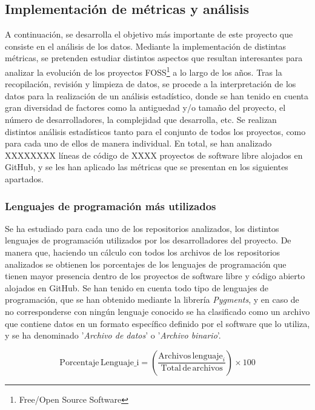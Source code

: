 \documentclass[a4paper, 12pt]{book}
\begin{document}
\subsection{Implementación de métricas y análisis}
\label{subsec:metricas}

A continuación, se desarrolla el objetivo más importante de este proyecto que consiste en el análisis de los datos. Mediante la implementación de distintas métricas, se pretenden estudiar distintos aspectos que resultan interesantes para analizar la evolución de los proyectos
FOSS\footnote{Free/Open Source Software} a lo largo de los años.
Tras la recopilación, revisión y limpieza de datos, se procede a la interpretación de los datos para la realización de un análisis estadístico, donde se han tenido en cuenta gran diversidad de factores como la antiguedad y/o tamaño del proyecto, el número de desarrolladores, la
complejidad que desarrolla, etc. Se realizan distintos análisis estadísticos tanto para el conjunto de todos los proyectos, como para cada uno de ellos de manera individual.
En total, se han analizado XXXXXXXX líneas de código de XXXX proyectos de software libre alojados en GitHub, y se les han aplicado las métricas que se presentan en los siguientes apartados.

\subsubsection{Lenguajes de programación más utilizados}
\label{subsubsec:lenguajes}

Se ha estudiado para cada uno de los repositorios analizados, los distintos lenguajes de programación utilizados por los desarrolladores del proyecto. De manera que, haciendo un cálculo con todos los archivos de los repositorios analizados se obtienen los porcentajes de los lenguajes
de programación que tienen mayor presencia dentro de los proyectos de software libre y código abierto alojados en GitHub. Se han tenido en cuenta todo tipo de lenguajes de programación, que se han obtenido mediante la librería \textit{Pygments},  y en caso de no corresponderse
con ningún lenguaje conocido se ha clasificado como un archivo que contiene datos en un formato específico definido por el software que lo utiliza, y se ha denominado '\textit{Archivo de datos}' o '\textit{Archivo binario}'.

\[\text{Porcentaje} \, \text{Lenguaje_i} = \left( \frac{\text{Archivos} \, \text{lenguaje}_i}{\text{Total} \, \text{de} \, \text{archivos}} \right) \times 100\]
\end{document}

